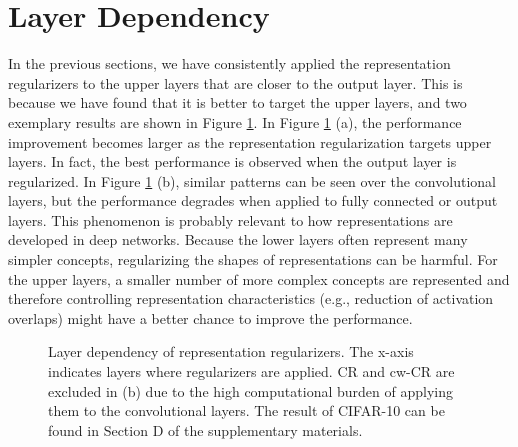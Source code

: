 \documentclass[letterpaper]{article} %
\begin{document}
\section{Layer Dependency}
In the previous sections, we have consistently applied the representation regularizers to the upper layers that are closer to the output layer. This is because we have found that it is better to target the upper layers, and two exemplary results are shown in Figure \ref{fig:layer_dependency}. In Figure \ref{fig:layer_dependency} (a), the performance improvement becomes larger as the representation regularization targets upper layers. In fact, the best performance is observed when the output layer is regularized. In Figure \ref{fig:layer_dependency} (b), similar patterns can be seen over the convolutional layers, but the performance degrades when applied to fully connected or output layers. This phenomenon is probably relevant to how representations are developed in deep networks. Because the lower layers often represent many simpler concepts, regularizing the shapes of representations can be harmful. For the upper layers, a smaller number of more complex concepts are represented and therefore controlling representation characteristics (e.g., reduction of activation overlaps) might have a better chance to improve the performance. 

\begin{figure}[t]
    \centering
    \hspace{-0.4\baselineskip}
    \caption{Layer dependency of representation regularizers. The x-axis indicates layers where regularizers are applied. CR and cw-CR are excluded in (b) due to the high computational burden of applying them to the convolutional layers. The result of CIFAR-10 can be found in Section D of the supplementary materials.}%
    \label{fig:layer_dependency}%
\end{figure}
\end{document}
